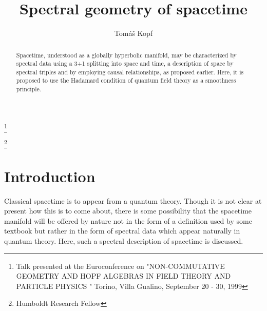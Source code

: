 \documentclass[a4paper,10pt,oneside]{amsart}
\theoremstyle{plain}
\theoremstyle{definition}
\theoremstyle{remark}
\begin{document}



\title[]{Spectral geometry of spacetime\coordHE{}}\thanks{\coordHE{}
Talk presented at the Euroconference on
      "NON-COMMUTATIVE GEOMETRY AND HOPF ALGEBRAS IN FIELD THEORY
                         AND PARTICLE PHYSICS "
         Torino, Villa Gualino, September 20 - 30, 1999}
\author{Tom\'{a}\v{s} Kopf\coordHE{}}\thanks{\coordHE{}Humboldt Research Fellow}

\address{ThEP, Institut f\"{u}r Physik, Johannes Gutenberg-Universit\"{a}t, \\
55099 Mainz, Germany}

\address{Matematical Institute of the Silesian University at Opava\\
Bezru\v{c}ovo n\'{a}m\v{e}st\'{i} 13 \\ 746 01 Opava, Czech Republic}

\address{Department of Physics, University of Alberta\\
Edmonton T6G 2G1, Canada}





\begin{abstract}
Spacetime, understood as a globally hyperbolic manifold, may be
characterized by spectral data using a 3+1 splitting into space
and time, a description of space by spectral triples and by
employing causal relationships, as proposed earlier.
Here, it is proposed to use the
Hadamard condition of quantum field theory as a smoothness principle.
\end{abstract}

\maketitle





\section{Introduction}


Classical spacetime is to appear from a quantum theory.
Though it is not clear
at present how this is to come about, there is some possibility
that the spacetime manifold will be offered by nature not in the
form of a definition used by some textbook but rather in the
form of spectral data which appear naturally in quantum theory.
Here, such a spectral description of spacetime is discussed.
\end{document}
